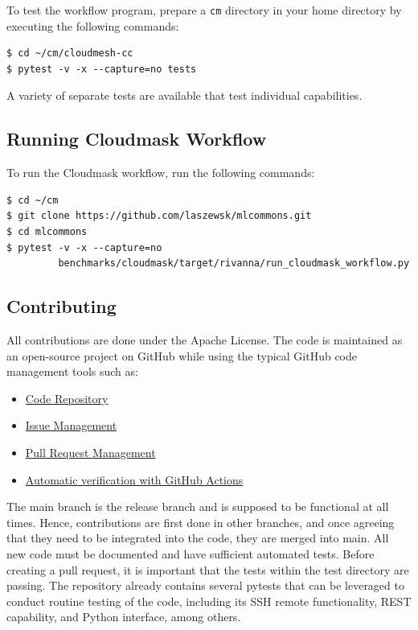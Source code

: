 \documentclass[sigplan,screen]{acmart}
\newcommand{\FILE}[1]{}
\begin{document}
To test the workflow program, prepare a {\scriptsize \verb|cm|}
directory in your home directory by executing the following commands:

{\scriptsize\begin{verbatim}
$ cd ~/cm/cloudmesh-cc
$ pytest -v -x --capture=no tests
\end{verbatim}}

A variety of separate tests are available that test individual
capabilities.


% 

\FILE{cloudmask-appendix.tex}

\subsection{Running Cloudmask Workflow}\label{sec:running-cloudmask}

To run the Cloudmask workflow, run the following commands:

{\scriptsize\begin{verbatim}
$ cd ~/cm
$ git clone https://github.com/laszewsk/mlcommons.git
$ cd mlcommons
$ pytest -v -x --capture=no
         benchmarks/cloudmask/target/rivanna/run_cloudmask_workflow.py
\end{verbatim}}


% 

\FILE{contributing.tex}

\subsection{Contributing}\label{contributing}

All contributions are done under the Apache License. The code is
maintained as an open-source project on GitHub while using the typical
GitHub code management tools such as:

\begin{itemize}
\item
  \href{https://github.com/cloudmesh/cloudmesh-cc}{Code Repository}
\item
  \href{https://github.com/cloudmesh/cloudmesh-cc/issues}{Issue Management}
\item
  \href{https://github.com/cloudmesh/cloudmesh-cc/pulls}{Pull Request Management}
\item
  \href{https://github.com/cloudmesh/cloudmesh-cc/actions}{Automatic verification with GitHub Actions}
\end{itemize}

The main branch is the release branch and is supposed to be functional
at all times. Hence, contributions are first done in other branches,
and once agreeing that they need to be integrated into the code, they
are merged into main. All new code must be documented and have
sufficient automated tests. Before creating a pull request, it is
important that the tests within the test directory are passing. The
repository already contains several pytests that can be leveraged to
conduct routine testing of the code, including its SSH remote
functionality, REST capability, and Python interface, among others.
\end{document}
